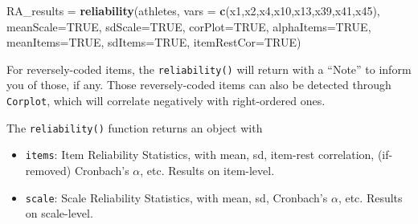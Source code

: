 \documentclass[
]{ctexart}
\newenvironment{Shaded}{\begin{snugshade}}{\end{snugshade}}
\newcommand{\AttributeTok}[1]{\textcolor[rgb]{0.13,0.29,0.53}{#1}}
\newcommand{\ConstantTok}[1]{\textcolor[rgb]{0.56,0.35,0.01}{#1}}
\newcommand{\FunctionTok}[1]{\textcolor[rgb]{0.13,0.29,0.53}{\textbf{#1}}}
\newcommand{\NormalTok}[1]{#1}
\newcommand{\OtherTok}[1]{\textcolor[rgb]{0.56,0.35,0.01}{#1}}
\newcommand{\SpecialCharTok}[1]{\textcolor[rgb]{0.81,0.36,0.00}{\textbf{#1}}}
\newcommand{\StringTok}[1]{\textcolor[rgb]{0.31,0.60,0.02}{#1}}
\providecommand{\tightlist}{%
  \setlength{\itemsep}{0pt}\setlength{\parskip}{0pt}}
\begin{document}
\begin{Shaded}
\begin{Highlighting}[]
\NormalTok{RA\_results }\OtherTok{=} \FunctionTok{reliability}\NormalTok{(athletes,}
                         \AttributeTok{vars =} \FunctionTok{c}\NormalTok{(}\StringTok{\textquotesingle{}x1\textquotesingle{}}\NormalTok{,}\StringTok{\textquotesingle{}x2\textquotesingle{}}\NormalTok{,}\StringTok{\textquotesingle{}x4\textquotesingle{}}\NormalTok{,}\StringTok{\textquotesingle{}x10\textquotesingle{}}\NormalTok{,}\StringTok{\textquotesingle{}x13\textquotesingle{}}\NormalTok{,}\StringTok{\textquotesingle{}x39\textquotesingle{}}\NormalTok{,}\StringTok{\textquotesingle{}x41\textquotesingle{}}\NormalTok{,}\StringTok{\textquotesingle{}x45\textquotesingle{}}\NormalTok{),}
                         \AttributeTok{meanScale=}\ConstantTok{TRUE}\NormalTok{,}
                         \AttributeTok{sdScale=}\ConstantTok{TRUE}\NormalTok{,}
                         \AttributeTok{corPlot=}\ConstantTok{TRUE}\NormalTok{,}
                         \AttributeTok{alphaItems=}\ConstantTok{TRUE}\NormalTok{,}
                         \AttributeTok{meanItems=}\ConstantTok{TRUE}\NormalTok{,}
                         \AttributeTok{sdItems=}\ConstantTok{TRUE}\NormalTok{,}
                         \AttributeTok{itemRestCor=}\ConstantTok{TRUE}\NormalTok{)}
\end{Highlighting}
\end{Shaded}

For reversely-coded items, the \texttt{reliability()} will return with a
``Note'' to inform you of those, if any. Those reversely-coded items can
also be detected through \texttt{Corplot}, which will correlate
negatively with right-ordered ones.

The \texttt{reliability()} function returns an object with

\begin{itemize}
\tightlist
\item
  \texttt{items}: Item Reliability Statistics, with mean, sd, item-rest
  correlation, (if-removed) Cronbach's \(\alpha\), etc. Results on
  item-level.
\item
  \texttt{scale}: Scale Reliability Statistics, with mean, sd,
  Cronbach's \(\alpha\), etc. Results on scale-level.
\end{itemize}

\begin{Shaded}
\end{Shaded}
\end{document}
